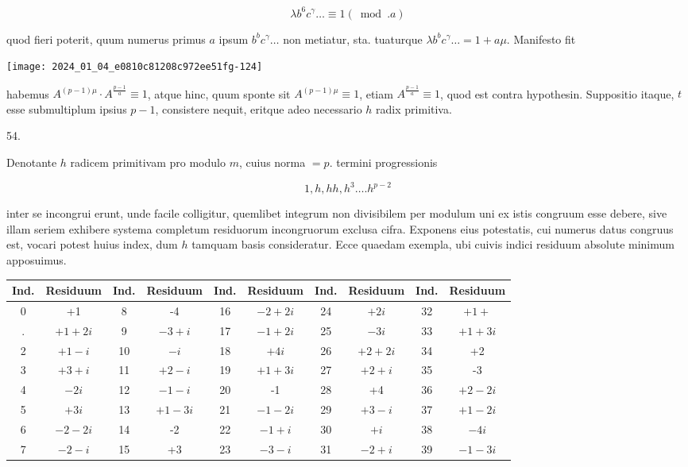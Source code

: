 \documentclass[10pt]{article}
\begin{document}
\[
\lambda b^{6} c^{\gamma} \ldots \equiv 1(\bmod . a)
\]

quod fieri poterit, quum numerus primus \(a\) ipsum \(b^{b} c^{\gamma} \ldots\) non metiatur, sta. tuaturque \(\lambda b^{b} c^{\gamma} \ldots=1+a \mu\). Manifesto fit

\begin{center}
\texttt{[image: 2024\_01\_04\_e0810c81208c972ee51fg-124]}
\end{center}

habemus \(A^{(p-1) \mu} \cdot A^{\frac{p-1}{a}} \equiv 1\), atque hinc, quum sponte sit \(A^{(p-1) \mu} \equiv 1\), etiam \(A^{\frac{p-1}{a}} \equiv 1\), quod est contra hypothesin. Suppositio itaque, \(t\) esse submultiplum ipsius \(p-1\), consistere nequit, eritque adeo necessario \(h\) radix primitiva.

54.

Denotante \(h\) radicem primitivam pro modulo \(m\), cuius norma \(=p\). termini progressionis

\[
1, h, h h, h^{3} \ldots . h^{p-2}
\]

inter se incongrui erunt, unde facile colligitur, quemlibet integrum non divisibilem per modulum uni ex istis congruum esse debere, sive illam seriem exhibere systema completum residuorum incongruorum exclusa cifra. Exponens eius potestatis, cui numerus datus congruus est, vocari potest huius index, dum \(h\) tamquam basis consideratur. Ecce quaedam exempla, ubi cuivis indici residuum absolute minimum apposuimus.

\begin{center}
\begin{tabular}{|c|c|c|c|c|c|c|c|c|c|}
\hline
Ind. & Residuum & Ind. & Residuum & Ind. & Residuum & Ind. & Residuum & Ind. & Residuum \\
\hline
0 & +1 & 8 & -4 & 16 & \(-2+2 i\) & 24 & \(+2 i\) & 32 & \(+1+\) \\
\hline
. & \(+1+2 i\) & 9 & \(-3+i\) & 17 & \(-1+2 i\) & 25 & \(-3 i\) & 33 & \(+1+3 i\) \\
\hline
2 & \(+1-i\) & 10 & \(-i\) & 18 & \(+4 i\) & 26 & \(+2+2 i\) & 34 & +2 \\
\hline
3 & \(+3+i\) & 11 & \(+2-i\) & 19 & \(+1+3 i\) & 27 & \(+2+i\) & 35 & -3 \\
\hline
4 & \(-2 i\) & 12 & \(-1-i\) & 20 & -1 & 28 & +4 & 36 & \(+2-2 i\) \\
\hline
5 & \(+3 i\) & 13 & \(+1-3 i\) & 21 & \(-1-2 i\) & 29 & \(+3-i\) & 37 & \(+1-2 i\) \\
\hline
6 & \(-2-2 i\) & 14 & -2 & 22 & \(-1+i\) & 30 & \(+i\) & 38 & \(-4 i\) \\
\hline
7 & \(-2-i\) & 15 & +3 & 23 & \(-3-i\) & 31 & \(-2+i\) & 39 & \(-1-3 i\) \\
\hline
\end{tabular}
\end{center}
\end{document}
